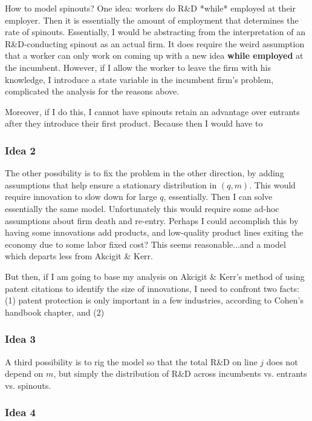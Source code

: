\documentclass[12pt,english]{article}
\theoremstyle{remark}
\begin{document}
How to model spinouts? One idea: workers do R\&D *while* employed at their employer. Then it is essentially the amount of employment that determines the rate of spinouts. Essentially, I would be abstracting from the interpretation of an R\&D-conducting spinout as an actual firm. It does require the weird assumption that a worker can only work on coming up with a new idea \textbf{while employed} at the incumbent. However, if I allow the worker to leave the firm with his knowledge, I introduce a state variable in the incumbent firm's problem, complicated the analysis for the reasons above. 

Moreover, if I do this, I cannot have spinouts retain an advantage over entrants after they introduce their first product. Because then I would have to 

\subsubsection{Idea 2}

The other possibility is to fix the problem in the other direction, by adding assumptions that help ensure a stationary distribution in $(q,m)$. This would require innovation to slow down for large $q$, essentially. Then I can solve essentially the same model. Unfortunately this would require some ad-hoc assumptions about firm death and re-entry. Perhaps I could accomplish this by having some innovations add products, and low-quality product lines exiting the economy due to some labor fixed cost? This seems reasonable...and a model which departs less from Akcigit \& Kerr. 

But then, if I am going to base my analysis on Akcigit \& Kerr's method of using patent citations to identify the size of innovations, I need to confront two facts: (1) patent protection is only important in a few industries, according to Cohen's handbook chapter, and (2) 

\subsubsection{Idea 3}

A third possibility is to rig the model so that the total R\&D on line $j$ does not depend on $m$, but simply the distribution of R\&D across incumbents vs. entrants vs. spinouts. 

\subsubsection{Idea 4}
\end{document}
